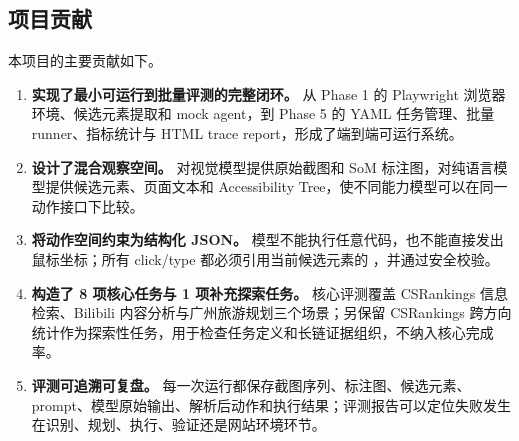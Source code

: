 \subsection{项目贡献}

本项目的主要贡献如下。

\begin{enumerate}
  \item \textbf{实现了最小可运行到批量评测的完整闭环。} 从 Phase 1 的 Playwright 浏览器环境、候选元素提取和 mock agent，到 Phase 5 的 YAML 任务管理、批量 runner、指标统计与 HTML trace report，形成了端到端可运行系统。
  \item \textbf{设计了混合观察空间。} 对视觉模型提供原始截图和 SoM 标注图，对纯语言模型提供候选元素、页面文本和 Accessibility Tree，使不同能力模型可以在同一动作接口下比较。
  \item \textbf{将动作空间约束为结构化 JSON。} 模型不能执行任意代码，也不能直接发出鼠标坐标；所有 click/type 都必须引用当前候选元素的 ，并通过安全校验。
  \item \textbf{构造了 8 项核心任务与 1 项补充探索任务。} 核心评测覆盖 CSRankings 信息检索、Bilibili 内容分析与广州旅游规划三个场景；另保留 CSRankings 跨方向统计作为探索性任务，用于检查任务定义和长链证据组织，不纳入核心完成率。
  \item \textbf{评测可追溯可复盘。} 每一次运行都保存截图序列、标注图、候选元素、prompt、模型原始输出、解析后动作和执行结果；评测报告可以定位失败发生在识别、规划、执行、验证还是网站环境环节。
\end{enumerate}
